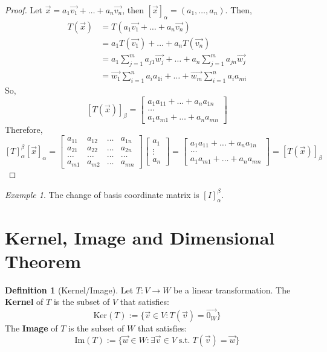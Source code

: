 \documentclass{article}
\theoremstyle{definition}
\newtheorem{definition}[theorem]{Definition}
\theoremstyle{remark}
\newtheorem{example}[theorem]{Example}
\begin{document}
\begin{proof}
    Let $\vec{x}=a_1\vec{v_1}+\dots+a_n\vec{v_n}$, then $[\vec{x}]_{\alpha}=(a_1,\dots,a_n)$.
    Then,
    \[
    \begin{aligned}
        T(\vec{x})&=T(a_1\vec{v_1}+\dots+a_n\vec{v_n})\\
    &=a_1T(\vec{v_1})+ \dots +a_nT(\vec{v_n})\\
    &=a_1\sum_{j=1}^{m}a_{j1}\vec{w_j}+\dots+a_n\sum_{j=1}^{m}a_{jn}\vec{w_j}\\
    &=\vec{w_1}\sum_{i=1}^{n}a_ia_{1i}+\dots +\vec{w_m}\sum_{i=1}^{n}a_ia_{mi}
    \end{aligned}
    \]
    So, 
    \[
    [T(\vec{x})]_{\beta}=
    \begin{bmatrix}
        a_1a_{11}+\dots+a_na_{1n}\\
        \dots\\
        a_1a_{m1}+\dots+a_na_{mn}
    \end{bmatrix}
    \]
    Therefore,
    \[
    [T]_{\alpha}^{\beta}[\vec{x}]_{\alpha}=
    \begin{bmatrix}
    a_{11} & a_{12} & \dots & a_{1n} \\
    a_{21} & a_{22} & \dots & a_{2n} \\
    \dots & \dots & \dots & \dots\\
    a_{m1} & a_{m2} & \dots & a_{mn}
    \end{bmatrix}
    \begin{bmatrix}
        a_1\\ \vdots\\a_n
    \end{bmatrix}
    =
    \begin{bmatrix}
        a_1a_{11}+\dots+a_na_{1n}\\
        \dots\\
        a_1a_{m1}+\dots+a_na_{mn}
    \end{bmatrix}=[T(\vec{x})]_{\beta}
    \]
\end{proof}

\begin{example}
    The change of basis coordinate matrix is $[I]_{\alpha}^{\beta}$.
\end{example}

\section{Kernel, Image and Dimensional Theorem}

\begin{definition}[Kernel/Image]
    Let $T:V\rightarrow W$ be a linear transformation. 
    The \textbf{Kernel} of $T$ is the subset of $V$ that satisfies:
    \[
    \text{Ker}(T):=\{\vec{v}\in V:T(\vec{v})=\vec{0_W}\}
    \]
    The \textbf{Image} of $T$ is the subset of $W$ that satisfies:
    \[
    \text{Im}(T):=\{\vec{w}\in W:\exists \vec{v}\in V\;\text{s.t.}\;T(\vec{v})=\vec{w}\}
    \]
\end{definition}
\end{document}
